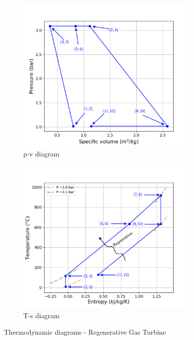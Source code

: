 \begin{figure}[h]
     \centering
     \begin{subfigure}[b]{0.4\textwidth}
         \centering
         \includegraphics[width=\textwidth]{pv_RGT}
         \caption{p-v diagram}
         \label{fig:C5_pv_RGT}
     \end{subfigure}
     \begin{subfigure}[b]{0.4\textwidth}
         \centering
         \includegraphics[width=\textwidth]{Ts_RGT}
         \caption{T-s diagram}
         \label{fig:C5_Ts_RGT}
     \end{subfigure}
        \caption{Thermodynamic diagrams - Regenerative Gas Turbine}
        \label{fig:C5_thermo_diagram_RGT}
\end{figure}

